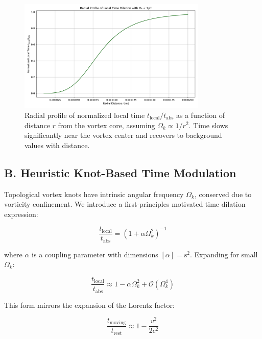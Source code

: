 \begin{figure}[h!]
    \centering
    \includegraphics[width=0.8\textwidth]{export/RadialProfileOfLocalTimeDilation_Radial_LocalTime_Dilation}
    \caption{Radial profile of normalized local time $t_{\text{local}} / t_{\text{abs}}$ as a function of distance $r$ from the vortex core, assuming $\Omega_k \propto 1/r^2$. Time slows significantly near the vortex center and recovers to background values with distance.}
    \label{fig:radial_time_profile}
\end{figure}

\subsection*{B. Heuristic Knot-Based Time Modulation}

Topological vortex knots have intrinsic angular frequency $\Omega_k$, conserved due to vorticity confinement. We introduce a first-principles motivated time dilation expression:

\begin{equation}
\frac{t_{\text{local}}}{t_{\text{abs}}} = \left(1 + \alpha \Omega_k^2 \right)^{-1}
\end{equation}

where $\alpha$ is a coupling parameter with dimensions $[\alpha] = \text{s}^2$. Expanding for small $\Omega_k$:

\begin{equation}
\frac{t_{\text{local}}}{t_{\text{abs}}} \approx 1 - \alpha \Omega_k^2 + \mathcal{O}(\Omega_k^4)
\end{equation}

This form mirrors the expansion of the Lorentz factor:

\begin{equation}
\frac{t_{\text{moving}}}{t_{\text{rest}}} \approx 1 - \frac{v^2}{2 c^2}
\end{equation}

